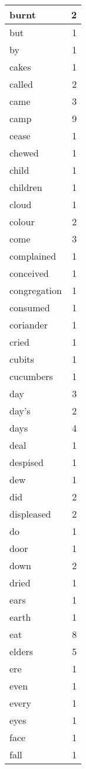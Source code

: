 \begin{center}
\begin{longtable}{l|r}
burnt & 2 \\ \hline
but & 1 \\ \hline
by & 1 \\ \hline
cakes & 1 \\ \hline
called & 2 \\ \hline
came & 3 \\ \hline
camp & 9 \\ \hline
cease & 1 \\ \hline
chewed & 1 \\ \hline
child & 1 \\ \hline
children & 1 \\ \hline
cloud & 1 \\ \hline
colour & 2 \\ \hline
come & 3 \\ \hline
complained & 1 \\ \hline
conceived & 1 \\ \hline
congregation & 1 \\ \hline
consumed & 1 \\ \hline
coriander & 1 \\ \hline
cried & 1 \\ \hline
cubits & 1 \\ \hline
cucumbers & 1 \\ \hline
day & 3 \\ \hline
day's & 2 \\ \hline
days & 4 \\ \hline
deal & 1 \\ \hline
despised & 1 \\ \hline
dew & 1 \\ \hline
did & 2 \\ \hline
displeased & 2 \\ \hline
do & 1 \\ \hline
door & 1 \\ \hline
down & 2 \\ \hline
dried & 1 \\ \hline
ears & 1 \\ \hline
earth & 1 \\ \hline
eat & 8 \\ \hline
elders & 5 \\ \hline
ere & 1 \\ \hline
even & 1 \\ \hline
every & 1 \\ \hline
eyes & 1 \\ \hline
face & 1 \\ \hline
fall & 1 \\ \hline

\end{longtable}
\end{center}
